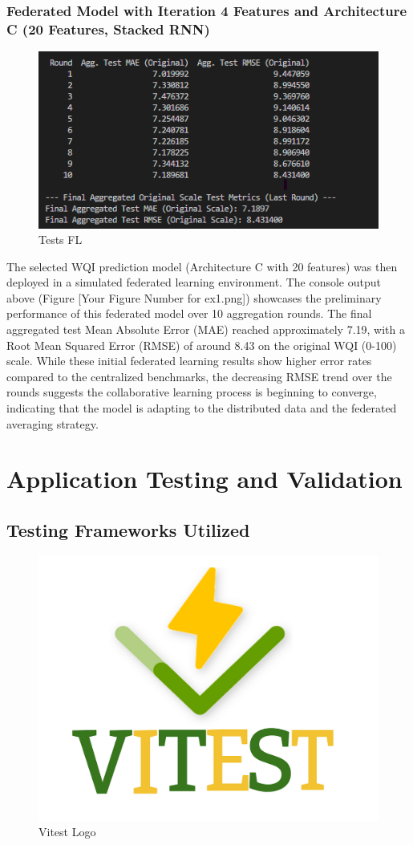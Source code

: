 \subsubsection{Federated Model with Iteration 4 Features and Architecture C (20 Features, Stacked RNN)}
\begin{figure}[H]
    \centering
    \includegraphics[width=0.75\linewidth]{Figures/ex1.png}
    \caption{Tests FL}
\end{figure}
 The selected WQI prediction model (Architecture C with 20 features) was then deployed in a simulated federated learning environment. The console output above (Figure [Your Figure Number for ex1.png]) showcases the preliminary performance of this federated model over 10 aggregation rounds. The final aggregated test Mean Absolute Error (MAE) reached approximately 7.19, with a Root Mean Squared Error (RMSE) of around 8.43 on the original WQI (0-100) scale. While these initial federated learning results show higher error rates compared to the centralized benchmarks, the decreasing RMSE trend over the rounds suggests the collaborative learning process is beginning to converge, indicating that the model is adapting to the distributed data and the federated averaging strategy.


\section{Application Testing and Validation}
\label{sec:testing_validation_summary}
\subsection{Testing Frameworks Utilized}
\label{ssec:testing_frameworks_summary}
\begin{figure}[H]
    \centering
    \includegraphics[width=0.25\linewidth]{Figures/Vitest.png}
    \caption{Vitest Logo}
    \label{fig:enter-label}
\end{figure}

